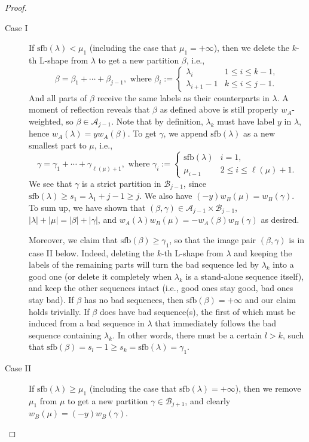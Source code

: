 \documentclass[11pt,reqno]{amsart}
\numberwithin{equation}{section}
\theoremstyle{plain}
\theoremstyle{definition}
\def\A{\mathcal{A}}
\def\la{\lambda}
\def\sfb{\mathrm{sfb}}
\def\gam{\gamma}
\newcommand{\B}{\mathcal{B}}
\begin{document}
\begin{proof}
\begin{description}
\item[Case I] If $\sfb(\la)<\mu_1$ (including the case that $\mu_1=+\infty$), then we delete the $k$-th L-shape from $\la$ to get a new partition $\beta$, i.e.,
$$
\beta=\beta_1+\cdots+\beta_{j-1}, \text{ where }
\beta_i:=\begin{cases}
\la_i & 1\le i\le k-1,\\
\la_{i+1}-1 & k\le i\le j-1.
\end{cases}
$$
And all parts of $\beta$ receive the same labels as their counterparts in $\la$. A moment of reflection reveals that $\beta$ as defined above is still properly $w_A$-weighted, so $\beta\in\A_{j-1}$. Note that by definition, $\la_k$ must have label $y$ in $\la$, hence $w_A(\la)=yw_A(\beta)$. To get $\gam$, we append $\sfb(\la)$ as a new smallest part to $\mu$, i.e.,
$$
\gam=\gam_1+\cdots+\gam_{\ell(\mu)+1}, \text{ where }
\gam_i:=\begin{cases}
\sfb(\la) & i=1,\\
\mu_{i-1} & 2\le i\le \ell(\mu)+1.
\end{cases}
$$
We see that $\gam$ is a strict partition in $\B_{j-1}$, since $\sfb(\la)\ge s_1=\la_1+j-1\ge j$. We also have $(-y)w_B(\mu)=w_B(\gam)$. To sum up, we have shown that $(\beta, \gam)\in \A_{j-1}\times \B_{j-1}$, $|\la|+|\mu|=|\beta|+|\gam|$, and $w_A(\la)w_B(\mu)=-w_A(\beta)w_B(\gam)$ as desired. 

Moreover, we claim that $\sfb(\beta)\ge\gam_{1}$, so that the image pair $(\beta,\gam)$ is in case II below. Indeed, deleting the $k$-th L-shape from $\la$ and keeping the labels of the remaining parts will turn the bad sequence led by $\la_k$ into a good one (or delete it completely when $\la_k$ is a stand-alone sequence itself), and keep the other sequences intact (i.e., good ones stay good, bad ones stay bad). If $\beta$ has no bad sequences, then $\sfb(\beta)=+\infty$ and our claim holds trivially. If $\beta$ does have bad sequence(s), the first of which must be induced from a bad sequence in $\la$ that immediately follows the bad sequence containing $\la_k$. In other words, there must be a certain $l>k$, such that $\sfb(\beta)=s_l-1\ge s_k=\sfb(\la)=\gam_1$. 



\item[Case II] If $\sfb(\la)\ge \mu_1$ (including the case that $\sfb(\la)=+\infty$), then we remove $\mu_1$ from $\mu$ to get a new partition $\gam\in\B_{j+1}$, and clearly $w_B(\mu)=(-y)w_B(\gam)$.


\end{description}
\end{proof}
\end{document}
